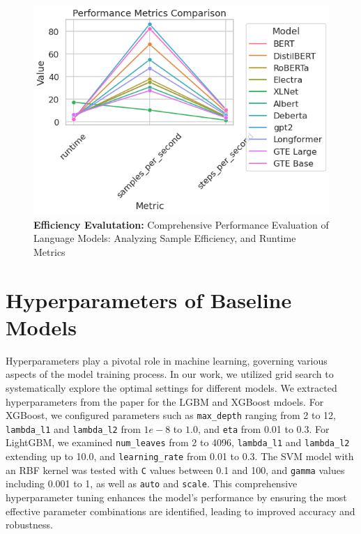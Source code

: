 \documentclass{article}
\theoremstyle{plain}
\theoremstyle{definition}
\theoremstyle{remark}
\begin{document}
\begin{figure}[H]
    \centering
    \includegraphics[width=5in]{performance.png}
    \caption{\textbf{Efficiency Evalutation:} Comprehensive Performance Evaluation of Language Models: Analyzing Sample Efficiency, and Runtime Metrics}
    \label{fig:enter-label}
\end{figure}


\newpage
\section{Hyperparameters of Baseline Models}
\label{hyperparemters}

Hyperparameters play a pivotal role in machine learning, governing various aspects of the model training process. In our work, we utilized grid search to systematically explore the optimal settings for different models. We extracted hyperparameters from the \cite{hegselmann2023tabllm} paper for the LGBM and XGBoost mdoels. For XGBoost, we configured parameters such as \texttt{max\_depth} ranging from 2 to 12, \texttt{lambda\_l1} and \texttt{lambda\_l2} from \(1e-8\) to $1.0$, and \texttt{eta} from 0.01 to 0.3. For LightGBM, we examined \texttt{num\_leaves} from 2 to 4096, \texttt{lambda\_l1} and \texttt{lambda\_l2} extending up to 10.0, and \texttt{learning\_rate} from 0.01 to 0.3. The SVM model with an RBF kernel was tested with \texttt{C} values between 0.1 and 100, and \texttt{gamma} values including 0.001 to 1, as well as \texttt{auto} and \texttt{scale}. This comprehensive hyperparameter tuning enhances the model's performance by ensuring the most effective parameter combinations are identified, leading to improved accuracy and robustness.
\end{document}
